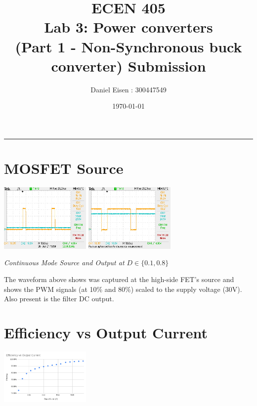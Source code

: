 \documentclass[11pt]{article}
\title{ECEN 405 \\ Lab 3: Power converters \\ (Part 1 - Non-Synchronous buck converter) Submission}
\author{Daniel Eisen : 300447549}
\date{\today}
\begin{document}
\begin{preview}

    \maketitle
    \hrule
    \section{MOSFET Source}
    \begin{center}
        \includegraphics[width=0.33\textwidth]{img/D10_22K.JPG}
        \includegraphics[width=0.33\textwidth]{img/D80_22K.JPG}

        \textit{Continuous Mode Source and Output at $D \in \{0.1, 0.8\}$}
    \end{center}
    The waveform above shows was captured at the high-side FET's source and shows  the PWM signals (at 10\% and 80\%) scaled to the supply voltage (30V). Also present is the filter DC output.

    \section{Efficiency vs Output Current}
    \begin{center}
        \includegraphics[width=0.33\textwidth]{img/nonsync_eff.png}
    

\end{center}
\end{preview}
\end{document}
